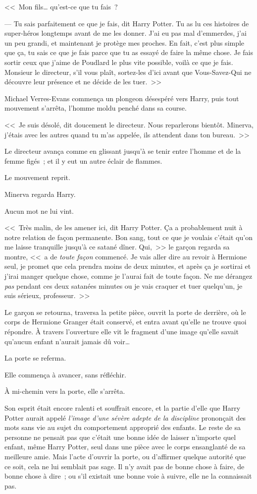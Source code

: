 <<~Mon fils… qu'est-ce que tu fais~?

--- Tu sais parfaitement ce que je fais, dit Harry Potter. Tu as lu ces histoires de super-héros longtemps avant de me les donner. J'ai eu pas mal d'emmerdes, j'ai un peu grandi, et maintenant je protège mes proches. En fait, c'est plus simple que ça, tu sais ce que je fais parce que tu as essayé de faire la même chose. Je fais sortir ceux que j'aime de Poudlard le plus vite possible, voilà ce que je fais. Monsieur le directeur, s'il vous plaît, sortez-les d'ici avant que Vous-Savez-Qui ne découvre leur présence et ne décide de les tuer.~>>

Michael Verres-Evans commença un plongeon désespéré vers Harry, puis tout mouvement s'arrêta, l'homme moldu penché dans sa course.

<<~Je suis désolé, dit doucement le directeur. Nous reparlerons bientôt. Minerva, j'étais avec les autres quand tu m'as appelée, ils attendent dans ton bureau.~>>

Le directeur avança comme en glissant jusqu'à se tenir entre l'homme et de la femme figés~; et il y eut un autre éclair de flammes.

Le mouvement reprit.

Minerva regarda Harry.

Aucun mot ne lui vint.

<<~Très malin, de les amener ici, dit Harry Potter. Ça a probablement nuit à notre relation de façon permanente. Bon sang, tout ce que je voulais c'était qu'on me laisse tranquille jusqu'à ce satané dîner. Qui,~>> le garçon regarda sa montre, <<~a de \emph{toute façon} commencé. Je vais aller dire au revoir à Hermione seul, je promet que cela prendra moins de deux minutes, et après ça je sortirai et j'irai manger quelque chose, comme je l'aurai fait de toute façon. Ne me dérangez \emph{pas} pendant ces deux satanées minutes ou je vais craquer et tuer quelqu'un, je suis sérieux, professeur.~>>

Le garçon se retourna, traversa la petite pièce, ouvrit la porte de derrière, où le corps de Hermione Granger était conservé, et entra avant qu'elle ne trouve quoi répondre. À travers l'ouverture elle vit le fragment d'une image qu'elle savait qu'aucun enfant n'aurait jamais dû voir…

La porte se referma.

Elle commença à avancer, sans réfléchir.

À mi-chemin vers la porte, elle s'arrêta.

Son esprit était encore ralenti et souffrait encore, et la partie d'elle que Harry Potter aurait appelé \emph{l'image d'une sévère adepte de la discipline} prononçait des mots sans vie au sujet du comportement approprié des enfants. Le reste de sa personne ne pensait pas que c'était une bonne idée de laisser n'importe quel enfant, même Harry Potter, seul dans une pièce avec le corps ensanglanté de sa meilleure amie. Mais l'acte d'ouvrir la porte, ou d'affirmer quelque autorité que ce soit, cela ne lui semblait pas sage. Il n'y avait pas de bonne chose à faire, de bonne chose à dire~; ou s'il existait une bonne voie à suivre, elle ne la connaissait pas.

